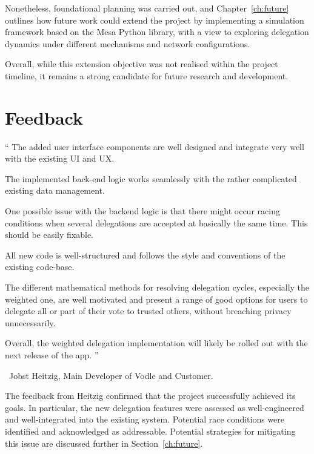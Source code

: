 Nonetheless, foundational planning was carried out, and Chapter~\ref{ch:future} outlines how future work could extend the project by implementing a simulation framework based on the Mesa Python library, with a view to exploring delegation dynamics under different mechanisms and network configurations.

Overall, while this extension objective was not realised within the project timeline, it remains a strong candidate for future research and development.


\section{Feedback}
\label{sec:feedback}

\begin{displayquote}
    \textquotedblleft{}
    The added user interface components are well designed and integrate very well with the existing UI and UX.
    
    The implemented back-end logic works seamlessly with the rather complicated existing data management.
    
    One possible issue with the backend logic is that there might occur racing conditions when several delegations are accepted at basically the same time. This should be easily fixable.
    
    All new code is well-structured and follows the style and conventions of the existing code-base.
    
    The different mathematical methods for resolving delegation cycles, especially the weighted one, are well motivated and present a range of good options for users to delegate all or part of their vote to trusted others, without breaching privacy unnecessarily.
    
    Overall, the weighted delegation implementation will likely be rolled out with the next release of the app.
    \textquotedblright{}
    \end{displayquote}
    
\begin{flushright}
\textemdash\ Jobst Heitzig, Main Developer of Vodle and Customer.
\end{flushright}
    

The feedback from Heitzig confirmed that the project successfully achieved its goals. In particular, the new delegation features were assessed as well-engineered and well-integrated into the existing system. Potential race conditions were identified and acknowledged as addressable. Potential strategies for mitigating this issue are discussed further in Section~\ref{ch:future}.

